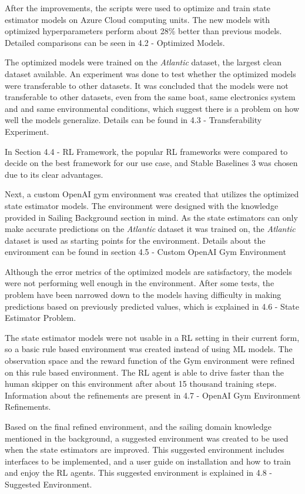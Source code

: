 \documentclass[12pt,twoside]{report}
\begin{document}
After the improvements, the scripts were used to optimize and train state estimator models on Azure Cloud computing units. The new models with optimized hyperparameters perform about 28\% better than previous models. Detailed comparisons can be seen in 4.2 - Optimized Models.

The optimized models were trained on the \textit{Atlantic} dataset, the largest clean dataset available. An experiment was done to test whether the optimized models were transferable to other datasets. It was concluded that the models were not transferable to other datasets, even from the same boat, same electronics system and and same environmental conditions, which suggest there is a problem on how well the models generalize. Details can be found in 4.3 - Transferability Experiment.

In Section 4.4 - RL Framework, the popular RL frameworks were compared to decide on the best framework for our use case, and Stable Baselines 3 was chosen due to its clear advantages.

Next, a custom OpenAI gym environment was created that utilizes the optimized state estimator models. The environment were designed with the knowledge provided in Sailing Background section in mind. As the state estimators can only make accurate predictions on the \textit{Atlantic} dataset it was trained on, the \textit{Atlantic} dataset is used as starting points for the environment. Details about the environment can be found in section 4.5 - Custom OpenAI Gym Environment

Although the error metrics of the optimized models are satisfactory, the models were not performing well enough in the environment. After some tests, the problem have been narrowed down to the models having difficulty in making predictions based on previously predicted values, which is explained in 4.6 - State Estimator Problem.

The state estimator models were not usable in a RL setting in their current form, so a basic rule based environment was created instead of using ML models. The observation space and the reward function of the Gym environment were refined on this rule based environment. The RL agent is able to drive faster than the human skipper on this environment after about 15 thousand training steps. Information about the refinements are present in 4.7 - OpenAI Gym Environment Refinements.

Based on the final refined environment, and the sailing domain knowledge mentioned in the background, a suggested environment was created to be used when the state estimators are improved. This suggested environment includes interfaces to be implemented, and a user guide on installation and how to train and enjoy the RL agents. This suggested environment is explained in 4.8 - Suggested Environment.
\end{document}
